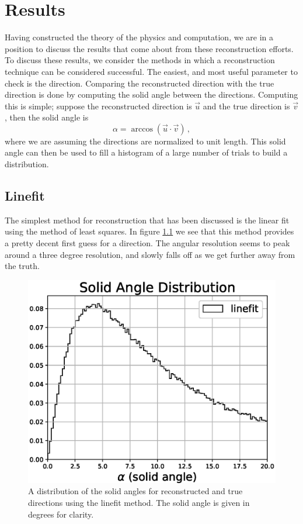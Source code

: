 \chapter{Results}

Having constructed the theory of the physics and computation, we are in a position to discuss the results that come about from these reconstruction efforts. To discuss these results, we consider the methods in which a reconstruction technique can be considered successful. The easiest, and most useful parameter to check is the direction. Comparing the reconstructed direction with the true direction is done by computing the solid angle between the directions. Computing this is simple; suppose the reconstructed direction is $\vec{u}$ and the true direction is $\vec{v}$, then the solid angle is
\begin{equation}
  \alpha = \arccos(\vec{u}\cdot\vec{v})\, ,
\end{equation}
where we are assuming the directions are normalized to unit length. This solid angle can then be used to fill a histogram of a large number of trials to build a distribution. 

\section{Linefit}

The simplest method for reconstruction that has been discussed is the linear fit using the method of least squares. In figure \ref{fig:alpha_linefit} we see that this method provides a pretty decent first guess for a direction. The angular resolution seems to peak around a three degree resolution, and slowly falls off as we get further away from the truth. 

\begin{figure}[H]
  \centering
  \includegraphics[width=12cm]{./Figures/reco_plots/alpha_dist_linefit_norm.eps}
  \caption{A distribution of the solid angles for reconstructed and true directions using the linefit method. The solid angle is given in degrees for clarity.}
  \label{fig:alpha_linefit}
\end{figure}

